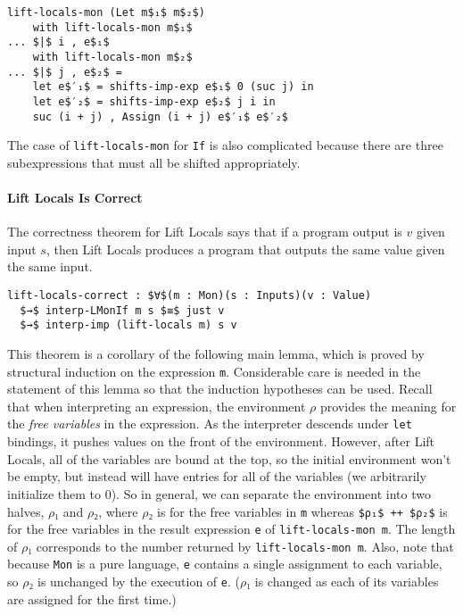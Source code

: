 \documentclass[sigplan,screen]{acmart}
\begin{document}
\begin{lstlisting}
lift-locals-mon (Let m$₁$ m$₂$)
    with lift-locals-mon m$₁$
... $|$ i , e$₁$
    with lift-locals-mon m$₂$
... $|$ j , e$₂$ =
    let e$′₁$ = shifts-imp-exp e$₁$ 0 (suc j) in
    let e$′₂$ = shifts-imp-exp e$₂$ j i in
    suc (i + j) , Assign (i + j) e$′₁$ e$′₂$
\end{lstlisting}

The case of \lstinline{lift-locals-mon} for \lstinline{If} is also
complicated because there are three subexpressions that must all be
shifted appropriately.

\paragraph{Lift Locals Is Correct}

The correctness theorem for Lift Locals says that if a program output
is $v$ given input $s$, then Lift Locals produces a program that
outputs the same value given the same input.

\begin{lstlisting}
lift-locals-correct : $∀$(m : Mon)(s : Inputs)(v : Value)
  $→$ interp-LMonIf m s $≡$ just v
  $→$ interp-imp (lift-locals m) s v
\end{lstlisting}

This theorem is a corollary of the following main lemma, which is
proved by structural induction on the expression \lstinline{m}.
Considerable care is needed in the statement of this lemma so that the
induction hypotheses can be used. Recall that when interpreting an
expression, the environment $ρ$ provides the meaning for the
\emph{free variables} in the expression.  As the interpreter descends
under \lstinline{let} bindings, it pushes values on the front of the
environment. However, after Lift Locals, all of the variables are
bound at the top, so the initial environment won't be empty, but
instead will have entries for all of the variables (we arbitrarily
initialize them to $0$). So in general, we can separate the
environment into two halves, $ρ₁$ and $ρ₂$, where $ρ₂$ is for the free
variables in \lstinline{m} whereas \lstinline{$ρ₁$ ++ $ρ₂$} is for the
free variables in the result expression \lstinline{e} of
\lstinline{lift-locals-mon m}. The length of $ρ₁$ corresponds to the
number returned by \lstinline{lift-locals-mon m}. Also, note that
because \lstinline{Mon} is a pure language, \lstinline{e} contains a
single assignment to each variable, so $ρ₂$ is unchanged by the
execution of \lstinline{e}. ($ρ₁$ is changed as each of its variables
are assigned for the first time.)
\end{document}

